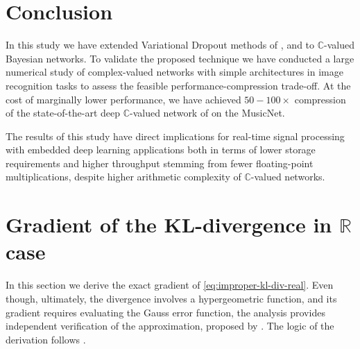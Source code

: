 \documentclass[a4paper,10pt,twocolumn]{article}
\newcommand{\real}{\mathbb{R}}
\newcommand{\cplx}{\mathbb{C}}
\begin{document}




\section{Conclusion} %
\label{sec:conclusion}

In this study we have extended Variational Dropout methods of \citet{kingma_variational_2015},
\citet{molchanov_variational_2017} and \citet{kharitonov_variational_2018} to $\cplx$-valued
Bayesian networks. To validate the proposed technique we have conducted a large numerical
study of complex-valued networks with simple architectures in image recognition tasks to
assess the feasible performance-compression trade-off. At the cost of marginally lower performance,
we have achieved $50-100\times$ compression of the state-of-the-art deep $\cplx$-valued network
of \citet{trabelsi_deep_2018} on the MusicNet.

The results of this study have direct implications for real-time signal processing with
embedded deep learning applications both in terms of lower storage requirements and higher
throughput stemming from fewer floating-point multiplications, despite higher arithmetic
complexity of $\cplx$-valued networks.







\appendix
\onecolumn

\section{Gradient of the KL-divergence in $\real$ case} %
\label{sec:real-chisq-grad}  %

In this section we derive the exact gradient of \eqref{eq:improper-kl-div-real}. Even
though, ultimately, the divergence involves a hypergeometric function, and its gradient
requires evaluating the Gauss error function, the analysis provides independent verification
of the approximation, proposed by \citet{molchanov_variational_2017}. The logic of the
derivation follows \citet{lapidoth_capacity_2003}.
\end{document}
